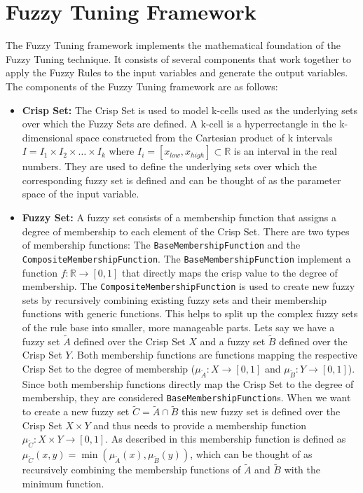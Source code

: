\section{Fuzzy Tuning Framework}

The Fuzzy Tuning framework implements the mathematical foundation of the Fuzzy Tuning technique. It consists of several components that work together to apply the Fuzzy Rules to the input variables and generate the output variables. The components of the Fuzzy Tuning framework are as follows:

\begin{itemize}
  \item \textbf{Crisp Set:} The Crisp Set is used to model k-cells used as the underlying sets over which the Fuzzy Sets are defined. A k-cell is a hyperrectangle in the k-dimensional space constructed from the Cartesian product of k intervals $I = I_1 \times I_2 \times \ldots \times I_k$ where $I_i = [x_{low}, x_{high}] \subset \mathbb{R} $ is an interval in the real numbers. They are used to define the underlying sets over which the corresponding fuzzy set is defined and can be thought of as the parameter space of the input variable.


  \item \textbf{Fuzzy Set:} A fuzzy set consists of a membership function that assigns a degree of membership to each element of the Crisp Set. There are two types of membership functions: The \texttt{BaseMembershipFunction} and the \texttt{CompositeMembershipFunction}. The \texttt{BaseMembershipFunction} implement a function $f: \mathbb{R} \rightarrow [0, 1]$ that directly maps the crisp value to the degree of membership. The \texttt{CompositeMembershipFunction} is used to create new fuzzy sets by recursively combining existing fuzzy sets and their membership functions with generic functions. This helps to split up the complex fuzzy sets of the rule base into smaller, more manageable parts. Lets say we have a fuzzy set $\tilde{A}$ defined over the Crisp Set $X$ and a fuzzy set $\tilde{B}$ defined over the Crisp Set $Y$. Both membership functions are functions mapping the respective Crisp Set to the degree of membership ($\mu_{\tilde{A}}: X \rightarrow [0, 1]$ and $\mu_{\tilde{B}}: Y \rightarrow [0, 1]$). Since both membership functions directly map the Crisp Set to the degree of membership, they are considered \texttt{BaseMembershipFunction}s. When we want to create a new fuzzy set $\tilde{C} = \tilde{A} \cap \tilde{B}$ this new fuzzy set is defined over the Crisp Set $X \times Y$  and thus needs to provide a membership function $\mu_{\tilde{C}}: X \times Y \rightarrow [0, 1]$. As described in  this membership function is defined as $\mu_{\tilde{C}}(x, y) = \min(\mu_{\tilde{A}}(x), \mu_{\tilde{B}}(y))$, which can be thought of as recursively combining the membership functions of $\tilde{A}$ and $\tilde{B}$ with the minimum function.


\end{itemize}
